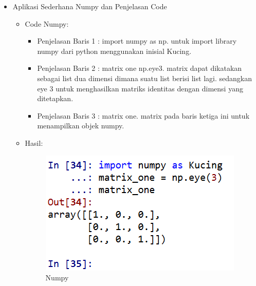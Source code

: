 \begin{enumerate}
\begin{itemize}
\par
\par
\item Aplikasi Sederhana Numpy dan Penjelasan Code 
\begin{itemize}
\item Code Numpy:
\par 
\par
\begin{itemize}
\item Penjelasan  Baris 1 : import numpy as np. untuk import library numpy dari python menggunakan inisial Kucing.
\par
\item Penjelasan  Baris 2 : matrix one np.eye3. matrix dapat dikatakan sebagai list dua dimensi dimana suatu list berisi list lagi. sedangkan eye 3 untuk menghasilkan matriks identitas dengan dimensi yang ditetapkan.
\par
\item Penjelasan  Baris 3 : matrix one. matrix pada baris ketiga ini untuk menampilkan objek numpy.
\par
\end{itemize}
\item Hasil:
\par
\par
\begin{figure}[ht]
\centering
\includegraphics[scale=0.8]{figures/andi/Numpy.PNG}
\caption{Numpy}
\label{contoh}
\end{figure}
\par
\par


\end{itemize}
\end{itemize}
\end{enumerate}
